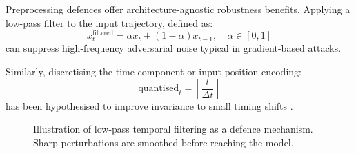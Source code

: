 Preprocessing defences offer architecture-agnostic robustness benefits. Applying a low-pass filter to the input trajectory, defined as:
\begin{equation}
x_t^{\text{filtered}} = \alpha x_t + (1 - \alpha) x_{t-1}, \quad \alpha \in [0, 1]
\end{equation}
can suppress high-frequency adversarial noise typical in gradient-based attacks.

Similarly, discretising the time component or input position encoding:
\begin{equation}
\text{quantised}_t = \left\lfloor \frac{t}{\Delta t} \right\rfloor
\end{equation}
has been hypothesised to improve invariance to small timing shifts \cite{wang2018adversarial}.


\begin{figure}[H]
    \centering
    \caption{Illustration of low-pass temporal filtering as a defence mechanism. Sharp perturbations are smoothed before reaching the model.}
    \label{fig:temporal_filter}
    \end{figure}


